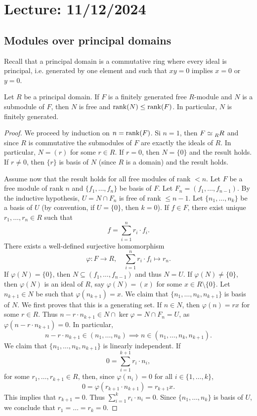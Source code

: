 \section{Lecture: 11/12/2024}


\subsection{Modules over principal domains}

Recall that a principal domain is a commutative ring where 
every ideal is principal, i.e. generated by one element and 
such that $xy=0$ implies $x=0$ or $y=0$. 

\begin{theorem}
\label{thm:rango}
Let $R$ be a principal domain. If $F$ is a finitely generated free $R$-module and 
$N$ is a submodule of $F$, then $N$ is free and 
$\operatorname{rank}(N)\leq\operatorname{rank}(F)$. In particular, $N$ is finitely generated. 
\end{theorem}

\begin{proof}
	We proceed by induction on $n=\operatorname{rank}(F)$. Si $n=1$, then
	$F\simeq\prescript{}{R}R$ 
	and since $R$ is commutative the submodules of $F$ are exactly the ideals of $R$. In particular,
	$N=(r)$ for some $r\in R$. If $r=0$, then $N=\{0\}$ and the result holds. If $r\ne 0$, then 
	$\{r\}$ is basis of $N$ (since $R$ is a domain) and the result holds.
	
	Assume now that the result holds for all free modules of rank $<n$. Let $F$ be a free module of
	rank $n$ and 
	$\{f_1,\dots,f_n\}$ be basis of $F$. Let $F_n=(f_1,\dots,f_{n-1})$. By the inductive hypothesis, 
	$U=N\cap F_n$ is free of rank $\leq n-1$. Let 
	$\{n_1,\dots,n_k\}$ be a basis of $U$ (by convention, if $U=\{0\}$, then $k=0$). If 
	$f\in F$, there exist unique $r_1,\dots,r_n\in R$ such that  
	\[
	f=\sum_{i=1}^n r_i\cdot f_i.
	\]
	There exists a well-defined surjective homomorphism 
	\[
	\varphi\colon F\to R,
	\quad
	\sum_{i=1}^nr_i\cdot f_i\mapsto r_n.
	\] 
	If $\varphi(N)=\{0\}$, then $N\subseteq (f_1,\dots,f_{n-1})$ and thus $N=U$. 
	If $\varphi(N)\ne\{0\}$, then $\varphi(N)$ is an ideal of 
	$R$, say $\varphi(N)=(x)$ for some $x\in R\setminus\{0\}$. Let $n_{k+1}\in N$ 
	be such that $\varphi(n_{k+1})=x$. 
    We claim that $\{n_1,\dots,n_k,n_{k+1}\}$ is basis of $N$. We first proves that 
    this is a generating set. 
	If $n\in N$, then $\varphi(n)=rx$ 
	for some $r\in R$. Thus $n-r\cdot n_{k+1}\in N\cap\ker\varphi=N\cap F_n=U$, as  
	$\varphi(n-r\cdot n_{k+1})=0$. In particular, 
	\[
	n-r\cdot n_{k+1}\in (n_1,\dots,n_k)\implies  
	n\in (n_1,\dots,n_k,n_{k+1}).
	\]
	We claim that 
	$\{n_1,\dots,n_k,n_{k+1}\}$ is linearly independent. If 
	\[
	0=\sum_{i=1}^{k+1}r_i\cdot n_i,
	\]
	for some $r_1,\dots,r_{k+1}\in R$, then, since 
	$\varphi(n_i)=0$ for all $i\in\{1,\dots,k\}$,
	\[
	0=\varphi(r_{k+1}\cdot n_{k+1})=r_{k+1}x.
	\]
	This implies that $r_{k+1}=0$. Thus $\sum_{i=1}^kr_i\cdot n_i=0$. Since
	$\{n_1,\dots,n_k\}$ is basis of $U$, we conclude that 
	$r_1=\dots=r_k=0$. 
\end{proof}

